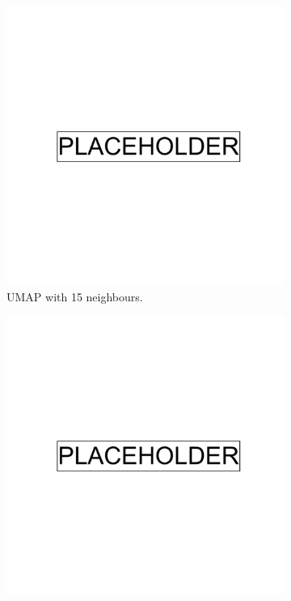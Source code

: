 \begin{figure}[h!]
  \centering
  \begin{subfigure}[b]{0.4\linewidth}
    \includegraphics[width=\linewidth]{placeholder.png}
    \caption{UMAP with 15 neighbours.}
    \label{fig:UMAP_low_NN_1KGP}
  \end{subfigure}
  \begin{subfigure}[b]{0.4\linewidth}
    \includegraphics[width=\linewidth]{placeholder.png}

\end{subfigure}
\end{figure}
